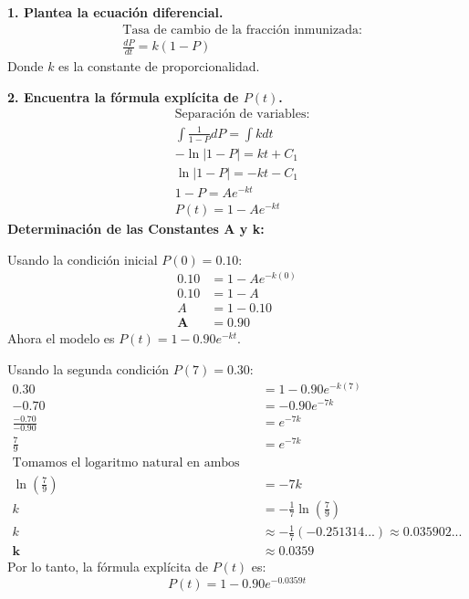 \documentclass[12pt, a4paper]{article}
\begin{document}
\noindent \textbf{1. Plantea la ecuación diferencial.}
\begin{align*}
&\text{Tasa de cambio de la fracción inmunizada:} \\
&\frac{dP}{dt} = k(1-P)
\end{align*}
Donde $k$ es la constante de proporcionalidad.

\vspace{0.5em}
\noindent \textbf{2. Encuentra la fórmula explícita de $P(t)$.}
\begin{align*}
&\text{Separación de variables:} \\
&\int \frac{1}{1-P} dP = \int k dt \\
&- \ln|1-P| = kt + C_1 \\
&\ln|1-P| = -kt - C_1 \\
&1-P = Ae^{-kt} \\
&P(t) = 1 - Ae^{-kt}
\end{align*}
\noindent \textbf{Determinación de las Constantes A y k:}

Usando la condición inicial $P(0) = 0.10$:
\begin{align*}
0.10 &= 1 - Ae^{-k(0)} \\
0.10 &= 1 - A \\
A &= 1 - 0.10 \\
\boldsymbol{A} &= \boldsymbol{0.90}
\end{align*}
Ahora el modelo es $P(t) = 1 - 0.90e^{-kt}$.

Usando la segunda condición $P(7) = 0.30$:
\begin{align*}
0.30 &= 1 - 0.90e^{-k(7)} \\
-0.70 &= -0.90e^{-7k} \\
\frac{-0.70}{-0.90} &= e^{-7k} \\
\frac{7}{9} &= e^{-7k} \\
\text{Tomamos el logaritmo natural en ambos lados:}\\
\ln\left(\frac{7}{9}\right) &= -7k \\
k &= -\frac{1}{7} \ln\left(\frac{7}{9}\right) \\
k &\approx -\frac{1}{7} (-0.251314...) \approx 0.035902... \\
\boldsymbol{k} &\approx \boldsymbol{0.0359}
\end{align*}
Por lo tanto, la fórmula explícita de $P(t)$ es:
\begin{equation*}
\boxed{P(t) = 1 - 0.90e^{-0.0359t}}
\end{equation*}
\end{document}
